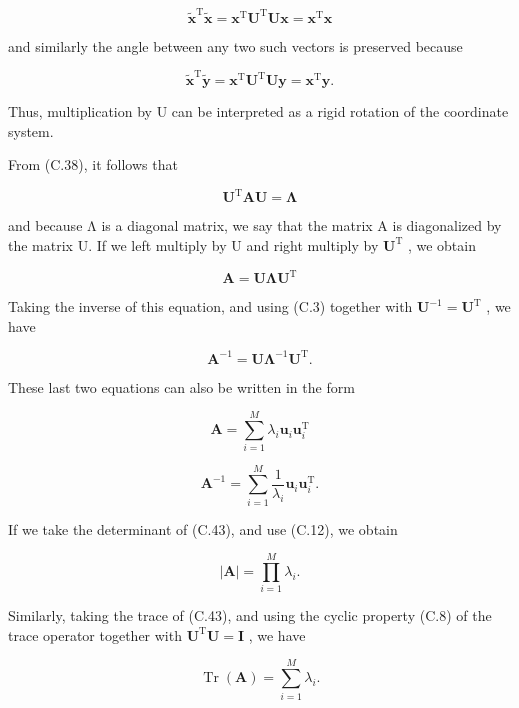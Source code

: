 \documentclass[
  10
]{article}
\begin{document}
\[
\widetilde {\mathbf {x}} ^ {\mathrm{T}} \widetilde {\mathbf {x}} = \mathbf {x} ^ {\mathrm{T}} \mathbf {U} ^ {\mathrm{T}} \mathbf {U} \mathbf {x} = \mathbf {x} ^ {\mathrm{T}} \mathbf {x}\tag{C.40}
\]

and similarly the angle between any two such vectors is preserved
because

\[
\widetilde {\mathbf {x}} ^ {\mathrm{T}} \widetilde {\mathbf {y}} = \mathbf {x} ^ {\mathrm{T}} \mathbf {U} ^ {\mathrm{T}} \mathbf {U} \mathbf {y} = \mathbf {x} ^ {\mathrm{T}} \mathbf {y}.\tag{C.41}
\]

Thus, multiplication by U can be interpreted as a rigid rotation of the
coordinate system.

From (C.38), it follows that

\[
\mathbf {U} ^ {\mathrm{T}} \mathbf {A} \mathbf {U} = \boldsymbol {\Lambda}\tag{C.42}
\]

and because Λ is a diagonal matrix, we say that the matrix A is
diagonalized by the matrix U. If we left multiply by U and right
multiply by \(\mathbf { U } ^ { \mathrm { T } }\) , we obtain

\[
\mathbf {A} = \mathbf {U} \boldsymbol {\Lambda} \mathbf {U} ^ {\mathrm{T}}\tag{C.43}
\]

Taking the inverse of this equation, and using (C.3) together with
\(\mathbf { U } ^ { - 1 } = \mathbf { U } ^ { \mathrm { T } }\) , we
have

\[
\mathbf {A} ^ {- 1} = \mathbf {U} \boldsymbol {\Lambda} ^ {- 1} \mathbf {U} ^ {\mathrm{T}}.\tag{C.44}
\]

These last two equations can also be written in the form

\[
\mathbf {A} = \sum_ {i = 1} ^ {M} \lambda_ {i} \mathbf {u} _ {i} \mathbf {u} _ {i} ^ {\mathrm{T}}\tag{C.45}
\]

\[
\mathbf {A} ^ {- 1} = \sum_ {i = 1} ^ {M} \frac {1}{\lambda_ {i}} \mathbf {u} _ {i} \mathbf {u} _ {i} ^ {\mathrm{T}}.\tag{C.46}
\]

If we take the determinant of (C.43), and use (C.12), we obtain

\[
| \mathbf {A} | = \prod_ {i = 1} ^ {M} \lambda_ {i}.\tag{C.47}
\]

Similarly, taking the trace of (C.43), and using the cyclic property
(C.8) of the trace operator together with
\(\mathbf { U } ^ { \mathrm { T } } \mathbf { U } = \mathbf { I }\) , we
have

\[
\operatorname{Tr} (\mathbf {A}) = \sum_ {i = 1} ^ {M} \lambda_ {i}.\tag{C.48}
\]
\end{document}
